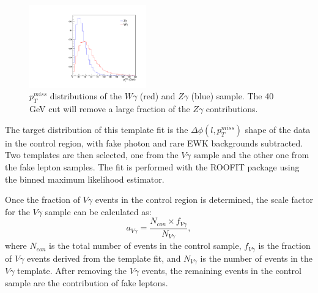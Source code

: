 \documentclass[thesis.tex]{subfiles}
\renewcommand\_{\textunderscore\allowbreak}
\begin{document}
\begin{figure}[!hbt]
  \centering
    \includegraphics[width=0.45\textwidth]{Figures/dphiTemplate_MET.pdf}
  \caption{$p_T^{miss}$ distributions of the $W\gamma$ (red) and $Z\gamma$ (blue) sample. The 40 GeV cut will remove a large fraction of the $Z\gamma$ contributions.}
    \label{fig:WGZG_met}
\end{figure}

The target distribution of this template fit is the $\Delta\phi(l,p_{T}^{miss})$ shape of the data in the control region, with fake photon and rare EWK backgrounds subtracted. Two templates are then selected, one from the $V\gamma$ sample and the other one from the fake lepton samples. The fit is performed with the ROOFIT package using the binned maximum likelihood estimator.

Once the fraction of $V\gamma$ events in the control region is determined, the scale factor for the $V\gamma$ sample can be calculated as: 
\begin{equation}
 		a_{V\gamma} = \frac{N_{con}\times f_{V\gamma}}{N_{V\gamma}}, 
\end{equation}
where $N_{con}$ is the total number of events in the control sample, $f_{V\gamma}$ is the fraction of $V\gamma$ events derived from the template fit, and $N_{V\gamma}$ is the number of events in the $V\gamma$ template. After removing the $V\gamma$ events, the remaining events in the control sample are the contribution of fake leptons. 

\end{document}
